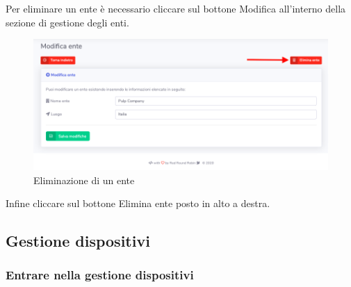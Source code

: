 		Per eliminare un ente è necessario cliccare sul bottone Modifica all'interno della sezione di gestione degli enti.

		\begin{figure}[H]
		\centering
		\includegraphics[scale=0.600]{res/images/admin/elimEnte.png}
		\caption{Eliminazione di un ente}
	\end{figure}


		Infine cliccare sul bottone Elimina ente posto in alto a destra.

	

\subsection{Gestione dispositivi}

	\subsubsection{Entrare nella gestione dispositivi}


